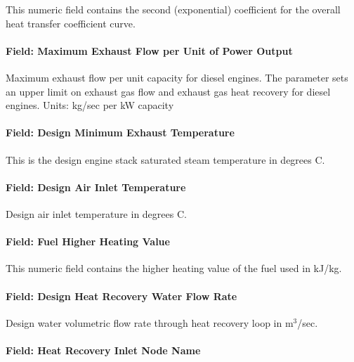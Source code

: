 This numeric field contains the second (exponential) coefficient for the overall heat transfer coefficient curve.

\paragraph{Field: Maximum Exhaust Flow per Unit of Power Output}\label{field-maximum-exhaust-flow-per-unit-of-power-output-1}

Maximum exhaust flow per unit capacity for diesel engines. The parameter sets an upper limit on exhaust gas flow and exhaust gas heat recovery for diesel engines. Units: kg/sec per kW capacity

\paragraph{Field: Design Minimum Exhaust Temperature}\label{field-design-minimum-exhaust-temperature-1}

This is the design engine stack saturated steam temperature in degrees C.

\paragraph{Field: Design Air Inlet Temperature}\label{field-design-air-inlet-temperature}

Design air inlet temperature in degrees C.

\paragraph{Field: Fuel Higher Heating Value}\label{field-fuel-higher-heating-value-1}

This numeric field contains the higher heating value of the fuel used in kJ/kg.

\paragraph{Field: Design Heat Recovery Water Flow Rate}\label{field-design-heat-recovery-water-flow-rate-1}

Design water volumetric flow rate through heat recovery loop in m\(^{3}\)/sec.

\paragraph{Field: Heat Recovery Inlet Node Name}\label{field-heat-recovery-inlet-node-name-1}

